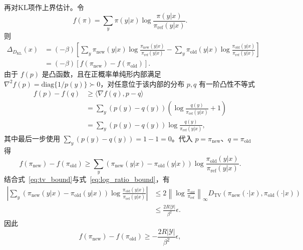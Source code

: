 再对KL项作上界估计。令
\begin{equation}
    f(\pi)=\sum_y\pi(y|x)\log\frac{\pi(y|x)}{\pi_{\mathrm{ref}}(y|x)}.
\end{equation}
则
\begin{equation}
\begin{aligned}
    \Delta_{D_{\mathrm{KL}}}(x)
    &=(-\beta)\left[
    \sum_y\pi_{\mathrm{new}}(y|x)\log\frac{\pi_{\mathrm{new}}(y|x)}{\pi_{\mathrm{ref}}(y|x)}
    -\sum_y\pi_{\mathrm{old}}(y|x)\log\frac{\pi_{\mathrm{old}}(y|x)}{\pi_{\mathrm{ref}}(y|x)}
    \right]\\
    &=(-\beta)\left[f(\pi_{\mathrm{new}})-f(\pi_{\mathrm{old}})\right].
\end{aligned}
\end{equation}
由于 $f(p)$ 是凸函数，且在正概率单纯形内部满足 $\nabla^2 f(p)=\mathrm{diag}\{1/p(y)\}\succ0$，对任意位于该内部的分布 $p,q$ 有一阶凸性不等式
\begin{equation}
\begin{aligned}
    f(p)-f(q)
    &\ge \langle \nabla f(q),p-q\rangle\\
    &=\sum_y(p(y)-q(y))\left(\log\frac{q(y)}{\pi_{\mathrm{ref}}(y|x)}+1\right)\\
    &=\sum_y(p(y)-q(y))\log\frac{q(y)}{\pi_{\mathrm{ref}}(y|x)},
\end{aligned}
\end{equation}
其中最后一步使用 $\sum_y(p(y)-q(y))=1-1=0$。代入 $p=\pi_{\mathrm{new}}$、$q=\pi_{\mathrm{old}}$ 得
\begin{equation}
    f(\pi_{\mathrm{new}})-f(\pi_{\mathrm{old}})
    \ge
    \sum_y\left(\pi_{\mathrm{new}}(y|x)-\pi_{\mathrm{old}}(y|x)\right)
    \log\frac{\pi_{\mathrm{old}}(y|x)}{\pi_{\mathrm{ref}}(y|x)}.
\end{equation}
结合式~\eqref{eq:tv_bound}与式~\eqref{eq:log_ratio_bound}，有
\begin{equation}
\begin{aligned}
    \left|\sum_y\left(\pi_{\mathrm{new}}(y|x)-\pi_{\mathrm{old}}(y|x)\right)
    \log\frac{\pi_{\mathrm{old}}(y|x)}{\pi_{\mathrm{ref}}(y|x)}\right|
    &\le 2\left\|\log\frac{\pi_{\mathrm{old}}}{\pi_{\mathrm{ref}}}\right\|_\infty
    D_{\mathrm{TV}}\left(\pi_{\mathrm{new}}(\cdot|x),\pi_{\mathrm{old}}(\cdot|x)\right)\\
    &\le\frac{2R|\mathcal{Y}|}{\beta^2}\epsilon.
\end{aligned}
\end{equation}
因此
\begin{equation}
    f(\pi_{\mathrm{new}})-f(\pi_{\mathrm{old}})
    \ge -\frac{2R|\mathcal{Y}|}{\beta^2}\epsilon,
\end{equation}
